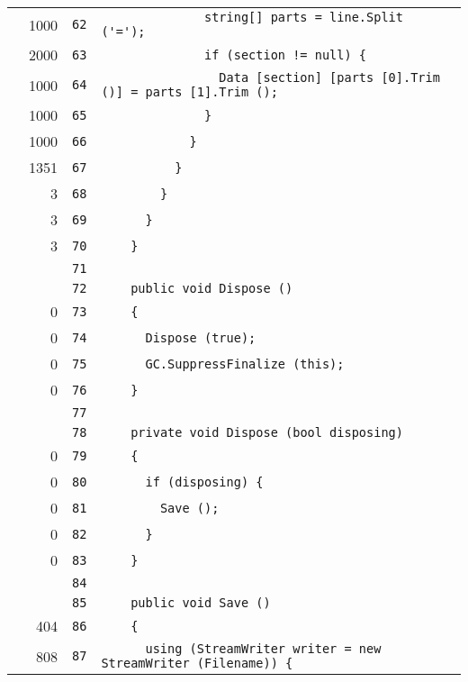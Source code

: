 \documentclass[a4paper,10pt]{article}
\begin{document}
\begin{longtable}[l]{lrrl}
\cellcolor{green} & 1000 & \verb~62~ & \verb~              string[] parts = line.Split ('=');~\\
\cellcolor{green} & 2000 & \verb~63~ & \verb~              if (section != null) {~\\
\cellcolor{green} & 1000 & \verb~64~ & \verb~                Data [section] [parts [0].Trim ()] = parts [1].Trim ();~\\
\cellcolor{green} & 1000 & \verb~65~ & \verb~              }~\\
\cellcolor{green} & 1000 & \verb~66~ & \verb~            }~\\
\cellcolor{green} & 1351 & \verb~67~ & \verb~          }~\\
\cellcolor{green} & 3 & \verb~68~ & \verb~        }~\\
\cellcolor{green} & 3 & \verb~69~ & \verb~      }~\\
\cellcolor{green} & 3 & \verb~70~ & \verb~    }~\\
\cellcolor{gray} &  & \verb~71~ & \verb~~\\
\cellcolor{gray} &  & \verb~72~ & \verb~    public void Dispose ()~\\
\cellcolor{red} & 0 & \verb~73~ & \verb~    {~\\
\cellcolor{red} & 0 & \verb~74~ & \verb~      Dispose (true);~\\
\cellcolor{red} & 0 & \verb~75~ & \verb~      GC.SuppressFinalize (this);~\\
\cellcolor{red} & 0 & \verb~76~ & \verb~    }~\\
\cellcolor{gray} &  & \verb~77~ & \verb~~\\
\cellcolor{gray} &  & \verb~78~ & \verb~    private void Dispose (bool disposing)~\\
\cellcolor{red} & 0 & \verb~79~ & \verb~    {~\\
\cellcolor{red} & 0 & \verb~80~ & \verb~      if (disposing) {~\\
\cellcolor{red} & 0 & \verb~81~ & \verb~        Save ();~\\
\cellcolor{red} & 0 & \verb~82~ & \verb~      }~\\
\cellcolor{red} & 0 & \verb~83~ & \verb~    }~\\
\cellcolor{gray} &  & \verb~84~ & \verb~~\\
\cellcolor{gray} &  & \verb~85~ & \verb~    public void Save ()~\\
\cellcolor{green} & 404 & \verb~86~ & \verb~    {~\\
\cellcolor{green} & 808 & \verb~87~ & \verb~      using (StreamWriter writer = new StreamWriter (Filename)) {~\\

\end{longtable}
\end{document}
